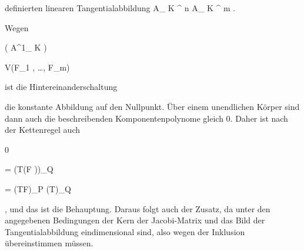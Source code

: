 {{ {  }


definierten linearen Tangentialabbildung
 { { {\mathbb A}_{  K }^{  n   } } } { { {\mathbb A}_{  K }^{  m   } }
} {.}}


\faktzusatz {}


}

{


Wegen


\mavergleichskette

{\vergleichskette

{ \varphi \left(  {\mathbb A}^{1}_{ K }  \right)
}

{ \subseteq }{ V(F_1 , \ldots ,  F_m)
}

{  }{
}

{    }{
}

{   }{
}

}
{}{}{}
ist die Hintereinanderschaltung

 die konstante Abbildung auf den Nullpunkt. Über einem unendlichen Körper sind dann auch die beschreibenden Komponentenpolynome gleich $0$. Daher ist nach der
 {} {}
Kettenregel
auch


\mavergleichskettedisp

{\vergleichskette

{ 0
}

{ =} {(T(F \circ \varphi))_Q
}

{ =} {(TF)_P \circ (T\varphi)_Q
}

{ } {
}

{ } {
}

}
{}{}{,}
und das ist die Behauptung. Daraus folgt auch der Zusatz, da unter den angegebenen Bedingungen der Kern der Jacobi-Matrix und das Bild der Tangentialabbildung eindimensional sind, also wegen der Inklusion übereinstimmen müssen.


}


